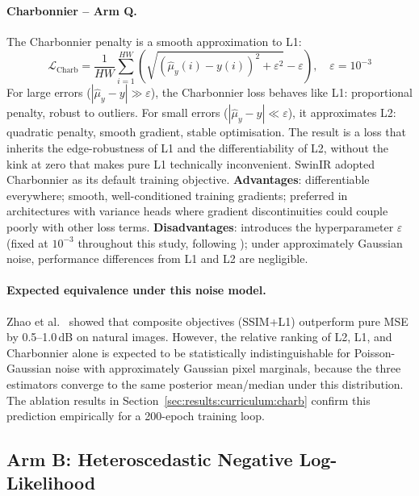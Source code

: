\documentclass[12pt, a4paper, twoside, openright]{book}
\begin{document}
\paragraph{Charbonnier -- Arm Q.}
The Charbonnier penalty \cite{charbonnier_two_1994} is a smooth approximation to L1:
\begin{equation}
\label{eq:methods:charbonnier}
\mathcal{L}_{\mathrm{Charb}} = \frac{1}{HW}\sum_{i=1}^{HW}\!\left(\sqrt{\left(\hat{\mu}_y(i)-y(i)\right)^2+\varepsilon^2}-\varepsilon\right), \quad \varepsilon = 10^{-3}
\end{equation}
For large errors ($|\hat{\mu}_y - y| \gg \varepsilon$), the Charbonnier loss behaves like L1: proportional penalty, robust to outliers. For small errors ($|\hat{\mu}_y - y| \ll \varepsilon$), it approximates L2: quadratic penalty, smooth gradient, stable optimisation. The result is a loss that inherits the edge-robustness of L1 and the differentiability of L2, without the kink at zero that makes pure L1 technically inconvenient. SwinIR \cite{liang_swinir_2021} adopted Charbonnier as its default training objective. \textbf{Advantages}: differentiable everywhere; smooth, well-conditioned training gradients; preferred in architectures with variance heads where gradient discontinuities could couple poorly with other loss terms. \textbf{Disadvantages}: introduces the hyperparameter $\varepsilon$ (fixed at $10^{-3}$ throughout this study, following \citeauthor{charbonnier_two_1994}); under approximately Gaussian noise, performance differences from L1 and L2 are negligible.

\paragraph{Expected equivalence under this noise model.}
Zhao et al.\ \cite{zhao_loss_2017} showed that composite objectives (SSIM+L1) outperform pure MSE by 0.5--1.0\,dB on natural images. However, the relative ranking of L2, L1, and Charbonnier alone is expected to be statistically indistinguishable for Poisson-Gaussian noise with approximately Gaussian pixel marginals, because the three estimators converge to the same posterior mean/median under this distribution. The ablation results in Section~\ref{sec:results:curriculum:charb} confirm this prediction empirically for a 200-epoch training loop.

\subsection{Arm B: Heteroscedastic Negative Log-Likelihood}
\label{sec:methods:loss:nll}
\end{document}
